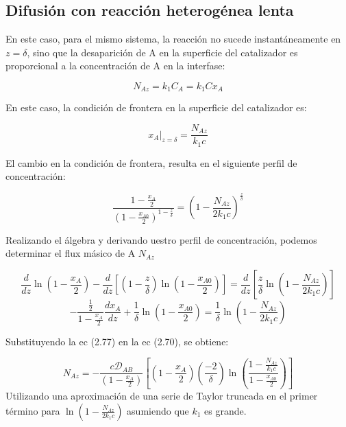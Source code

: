 \subsection{Difusión con reacción heterogénea lenta}

En este caso, para el mismo sistema, la reacción no sucede instantáneamente en $z=\delta$, sino que la desaparición de A en la superficie del catalizador es proporcional a la concentración de A en la interfase:

\begin{equation}
    N_{Az}=k_1C_A=k_1Cx_A
\end{equation}

En este caso, la condición de frontera en la superficie del catalizador es:

\begin{equation*}
    x_A|_{z=\delta}=\frac{N_{Az}}{k_1c}
\end{equation*}

El cambio en la condición de frontera, resulta en el siguiente perfil de concentración:

\begin{equation}
    \frac{1-\frac{x_A}{2}}{(1-\frac{x_{A0}}{2})^{1-\frac{z}{\delta}}}=(1-\frac{N_{Az}}{2k_1c})^{\frac{z}{\delta}}
\end{equation}

Realizando el álgebra y derivando uestro perfil de concentración, podemos determinar el flux másico de A $N_{Az}$

\begin{equation*}
    \frac{d}{dz}\ln(1-\frac{x_A}{2})-\frac{d}{dz}[(1-\frac{z}{\delta})\ln(1-\frac{x_{A0}}{2})]=\frac{d}{dz}[\frac{z}{\delta}\ln (1-\frac{N_{Az}}{2k_1c})]
\end{equation*}
\begin{equation}
    -\frac{\frac{1}{2}}{1-\frac{x_A}{2}}\frac{dx_A}{dz}+\frac{1}{\delta}\ln (1-\frac{x_{A0}}{2})=\frac{1}{\delta}\ln (1-\frac{N_{Az}}{2k_1c})
\end{equation}

Substituyendo la ec (2.77) en la ec (2.70), se obtiene:

\begin{equation*}
    N_{Az}=-\frac{c\mathscr{D}_{AB}}{(1-\frac{x_A}{2})}[(1-\frac{x_A}{2})(\frac{-2}{\delta})\ln (\frac{1-\frac{N_{Az}}{k_1c}}{1-\frac{x_{A0}}{2}})]
\end{equation*}
Utilizando una aproximación de una serie de Taylor truncada en el primer término para $\ln (1-\frac{N_{Az}}{2k_1c})$ asumiendo que $k_1$ es grande.

